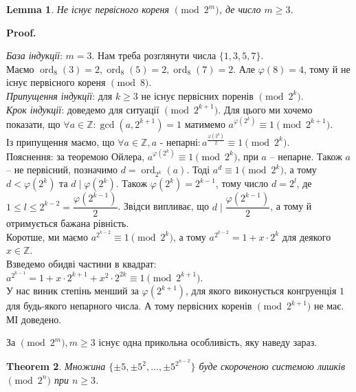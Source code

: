 \documentclass[a4paper, 10pt]{article}
\makeatletter
\theoremstyle{theoremdd}
\newtheorem{theorem}{Theorem}[subsection]
\theoremstyle{theoremdd}
\theoremstyle{theoremdd}
\theoremstyle{theoremdd}
\theoremstyle{theoremdd}
\theoremstyle{theoremdd}
\theoremstyle{theoremdd}
\newtheorem{lemma}[theorem]{Lemma}
\theoremstyle{theoremdd}
\renewenvironment{proof}[1][Proof.\\]{\par
\pushQED{\hfill \qed}%
\normalfont \topsep6\p@\@plus6\p@\relax
\trivlist
\item\relax
{\bfseries
#1\@addpunct{.}}\hspace\labelsep\ignorespaces
}{%
\popQED\endtrivlist\@endpefalse
}
\DeclareMathOperator{\ord}{ord}
\makeatother
\begin{document}
\begin{lemma}
Не існує первісного кореня $\!\! \pmod {2^m}$, де число $m \geq 3$.
\end{lemma}

\begin{proof}
\textit{База індукції}: $m = 3$. Нам треба розглянути числа $\{1,3,5,7\}$. \\
Маємо $\ord_8 (3) = 2, \ord_8 (5) = 2, \ord_8 (7) = 2$. Але $\varphi(8) = 4$, тому й не існує первісного кореня $\!\! \pmod 8$.\\
\textit{Припущення індукції}: для $k \geq 3$ не існує первісних поренів $\!\! \pmod {2^k}$.\\
\textit{Крок індукції}: доведемо для ситуації $\!\! \pmod {2^{k+1}}$. Для цього ми хочемо показати, що $\forall a \in \mathbb{Z}: \gcd(a,2^{k+1}) = 1$ матимемо $a^{\varphi(2^k)} \equiv 1 \pmod {2^{k+1}}$.\\
Із припущення маємо, що $\forall a \in \mathbb{Z}, a \text{ - непарні}: a^{\frac{\varphi(2^k)}{2}} \equiv 1 \pmod {2^k}$.\\
Пояснення: за теоремою Ойлера, $a^{\varphi(2^k)} \equiv 1 \pmod {2^k}$, при $a$ -- непарне. Також $a$ -- не первісний, позначимо $d = \ord_{2^k}(a)$. Тоді $a^d \equiv 1 \pmod {2^k}$, а тому $d < \varphi(2^k)$ та $d \mid \varphi(2^k)$. Також $\varphi(2^k) = 2^{k-1}$, тому число $d = 2^l$, де $1 \leq l \leq 2^{k-2} = \dfrac{\varphi(2^{k-1})}{2}$. Звідси випливає, що $d \mid \dfrac{\varphi(2^{k-1})}{2}$, а тому й отримується бажана рівність.\\
Коротше, ми маємо $a^{2^{k-2}} \equiv 1 \pmod {2^k}$, а тому  $a^{2^{k-2}} = 1 + x \cdot 2^k$ для деякого $x \in \mathbb{Z}$.\\
Взведемо обидві частини в квадрат:\\
$a^{2^{k-1}} = 1 + x \cdot 2^{k+1} + x^2 \cdot 2^{2k} \equiv 1 \pmod {2^{k+1}}$.\\
У нас виник степінь менший за $\varphi(2^{k+1})$, для якого виконується конгруенція $1$ для будь-якого непарного числа. А тому первісних коренів $\pmod {2^{k+1}}$ не має.\\
МІ доведено.
\end{proof}

За $\!\!\pmod {2^m}, m \geq 3$ існує одна прикольна особливість, яку наведу зараз.

\begin{theorem}
Множина $\{\pm 5, \pm 5^2, \dots, \pm 5^{2^{n-2}}\}$ буде скороченою системою лишків $\!\! \pmod {2^n}$ при $n \geq 3$.
\end{theorem}
\end{document}
